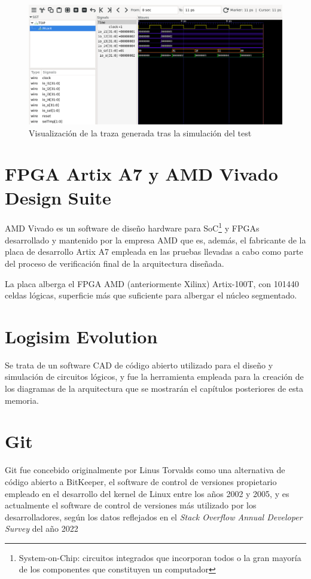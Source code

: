 \vspace{+0.5cm}
\begin{figure}[h]
  \centering
  \includegraphics[width=0.8\linewidth]{res/img/test_mux4_gtkwave.png}
  \caption{Visualización de la traza generada tras la simulación del test}
\end{figure}

\section{FPGA Artix A7 y AMD Vivado Design Suite}

AMD Vivado es un software de diseño hardware para SoC\footnote{System-on-Chip: circuitos integrados que incorporan todos o la gran mayoría de los componentes que constituyen un computador} y FPGAs desarrollado y mantenido por la empresa AMD que es, además, el fabricante de la placa de desarrollo Artix A7 empleada en las pruebas llevadas a cabo como parte del proceso de verificación final de la arquitectura diseñada.

La placa alberga el FPGA AMD (anteriormente Xilinx) Artix-100T, con 101440 celdas lógicas\cite{arty}, superficie más que suficiente para albergar el núcleo segmentado.

\section{Logisim Evolution}

Se trata de un software CAD de código abierto utilizado para el diseño y simulación de circuitos lógicos, y fue la herramienta empleada para la creación de los diagramas de la arquitectura que se mostrarán el capítulos posteriores de esta memoria.

\section{Git}

Git fue concebido originalmente por Linus Torvalds como una alternativa de código abierto a BitKeeper, el software de control de versiones propietario empleado en el desarrollo del kernel de Linux entre los años 2002 y 2005\cite{githistory}, y es actualmente el software de control de versiones más utilizado por los desarrolladores, según los datos reflejados en el \textit{Stack Overflow Annual Developer Survey} del año 2022\cite{stackoverflow}